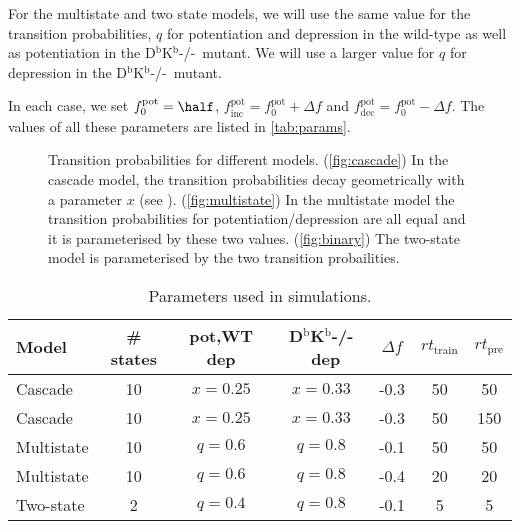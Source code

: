 \documentclass[12pt]{article}
\newcommand{\pot}{^{\text{pot}}}
\newcommand{\norm}{_0}
\newcommand{\inc}{_{\text{inc}}}
\newcommand{\dec}{_{\text{dec}}}
\newcommand{\KO}{D$^\mathrm{b}$K$^\mathrm{b}$-/-}
\newcommand{\tpre}{t_{\text{pre}}}
\newcommand{\ttrain}{t_{\text{train}}}
\begin{document}
For the multistate and two state models, we will use the same value for the transition probabilities, $q$ for potentiation and depression in the wild-type as well as potentiation in the \KO\ mutant.
We will use a larger value for $q$ for depression in the \KO\ mutant.

In each case, we set $f\pot\norm=\half$, $f\pot\inc=f\pot\norm+\Delta f$ and $f\pot\dec=f\pot\norm-\Delta f$. The values of all these parameters are listed in \autoref{tab:params}.

\begin{figure}
 \begin{center}
 \begin{myenuma}
  \item{}\label{fig:cascade}\hspace{0.5cm}
  \item{}\label{fig:multistate}\hspace{0.5cm}
  \item{}\label{fig:binary}
 \end{myenuma}
 \end{center}
  \caption{Transition probabilities for different models.
  (\ref{fig:cascade}) In the cascade model, the transition probabilities decay geometrically with a parameter $x$ (see \cite{Fusi2005cascade}).
  (\ref{fig:multistate}) In the multistate model the transition probabilities for potentiation/depression are all equal and it is parameterised by these two values.
  (\ref{fig:binary}) The two-state model is parameterised by the two transition probailities.} \label{fig:models}
\end{figure}

\begin{table}
 \begin{center}
  \begin{tabular}{|l|c|c|c|c|c|c|}
    \hline
    Model & \# states & pot,WT dep & \KO\ dep & $\Delta f$ & $r\ttrain$ & $r\tpre$ \\
    \hline
    Cascade    & 10 & $x=0.25$ & $x=0.33$ & -0.3 & 50 & 50 \\
    Cascade    & 10 & $x=0.25$ & $x=0.33$ & -0.3 & 50 & 150 \\
    Multistate & 10 & $q=0.6$  & $q=0.8$  & -0.1 & 50 & 50 \\
    Multistate & 10 & $q=0.6$  & $q=0.8$  & -0.4 & 20 & 20 \\
    Two-state  & 2  & $q=0.4$  & $q=0.8$  & -0.1 & 5 & 5 \\
    \hline
  \end{tabular}
 \end{center}
  \caption{Parameters used in simulations.} \label{tab:params}
\end{table}
\end{document}
